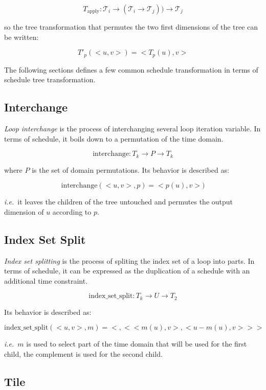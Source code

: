 \documentclass{article}
\begin{document}
\[
    T_\text{apply}: \mathcal{T}_i \rightarrow ( \mathcal{T}_i \rightarrow \mathcal{T}_j) ) \rightarrow \mathcal{T}_j
\]


\noindent so the tree transformation that permutes the two first dimensions of the tree can be written:

\[
    T'_p(< u, v >) = < T_p(u), v >
\]


The following sections defines a few common schedule transformation in terms of schedule tree transformation.

\subsection{Interchange}

\emph{Loop interchange} is the process of interchanging several loop iteration
variable. In terms of schedule, it boils down to a permutation of the time
domain.

\[
    \text{interchange}: T_k \rightarrow P \rightarrow T_k
\]

\noindent where $P$ is the set of domain permutations. Its behavior is described as:

\[
    \text{interchange}(<u, v>, p) = <p(u), v>)
\]

\noindent \emph{i.e.}\ it leaves the children of the tree untouched and
permutes the output dimension of $u$ according to $p$.

\subsection{Index Set Split}

\emph{Index set splitting} is the process of spliting the index set of a loop
into parts. In terms of schedule, it can be expressed as the duplication of a
schedule with an additional time constraint.

\[
    \text{index\_set\_split}: T_k \rightarrow U \rightarrow T_2
\]

Its behavior is described as:

\[
    \text{index\_set\_split}(<u, v>, m) = < {}, < < m(u), v>, < u - m(u), v> > >
\]

\noindent \emph{i.e.}\ $m$ is used to select part of the time domain that will
be used for the first child, the complement is used for the second child.

\subsection{Tile}
\end{document}
